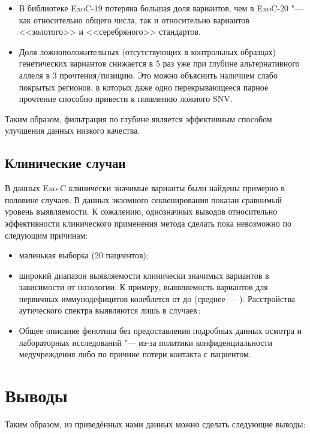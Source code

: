 \documentclass[a4paper,14pt]{extarticle}
\newcommand{\ecitep}[1]{\textenglish{\citep{#1}}}
\begin{document}
\begin{itemize}
	\item В библиотеке ExoC-19 потеряна большая доля вариантов, чем в ExoC-20 "--- как относительно общего числа, так и относительно вариантов <<золотого>> и <<серебряного>> стандартов.
	\item Доля ложноположительных (отсутствующих в контрольных образцах) генетических вариантов снижается в 5 раз уже при глубине альтернативного аллеля в 3 прочтения/позицию.
	Это можно объяснить наличием слабо покрытых регионов, в которых даже одно перекрывающееся парное прочтение способно привести к появлению ложного SNV.
\end{itemize}

Таким образом, фильтрация по глубине является эффективным способом улучшения данных низкого качества.

\subsection{Клинические случаи}

В данных Exo-C клинически значимые варианты были найдены примерно в половине случаев.
В данных экзомного секвенирования показан сравнимый уровень выявляемости.
К сожалению, однозначных выводов относительно эффективности клинического применения метода сделать пока невозможно по следующим причинам:

\begin{itemize}
\item маленькая выборка (20 пациентов);
\item широкий диапазон выявляемости клинически значимых вариантов в зависимости от нозологии.
К примеру, выявляемость вариантов для первичных иммунодефицитов колеблется от  до  (среднее  --- \citealp{Vorsteveld_2021}).
Расстройства аутического спектра выявляются лишь в  случаев\,\ecitep{Du_2018};
\item Общее описание фенотипа без предоставления подробных данных осмотра и лабораторных исследований "--- из-за политики конфиденциальности медучреждения либо по причине потери контакта с пациентом.
\end{itemize}

\section*{Выводы}

Таким образом, из приведённых нами данных можно сделать следующие выводы:
\end{document}
